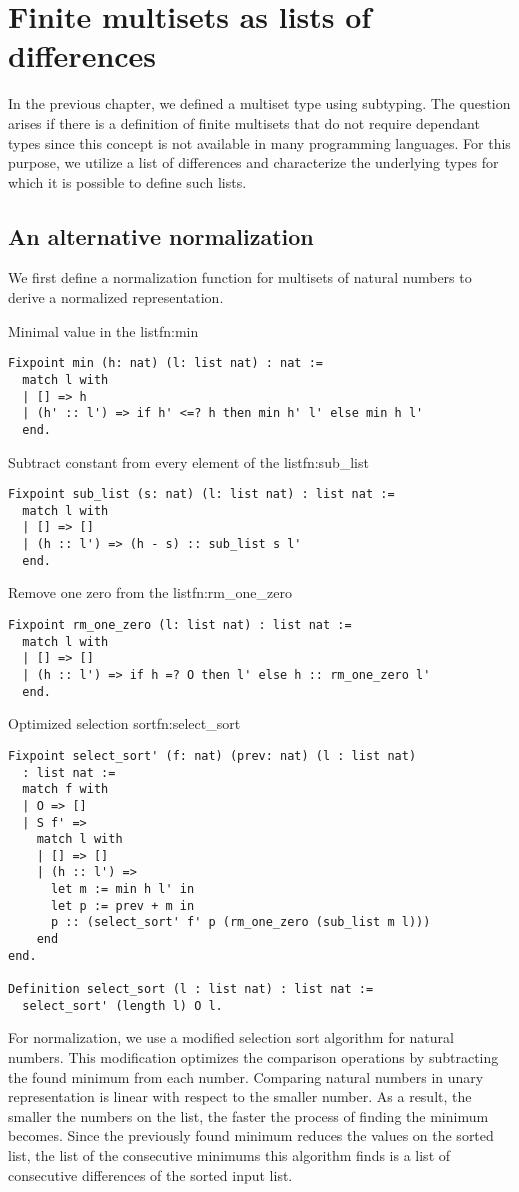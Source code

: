 \section{Finite multisets as lists of differences}
In the previous chapter, we defined a multiset type using subtyping. The question arises if there is a definition of finite multisets that do not require dependant types since this concept is not available in many programming languages. For this purpose, we utilize a list of differences and characterize the underlying types for which it is possible to define such lists.
\subsection{An alternative normalization}
We first define a normalization function for multisets of natural numbers to derive a normalized representation.
\begin{func}{Minimal value in the list}{fn:min}
\begin{verbatim}
Fixpoint min (h: nat) (l: list nat) : nat :=
  match l with
  | [] => h
  | (h' :: l') => if h' <=? h then min h' l' else min h l'
  end.
\end{verbatim}
\end{func}
\begin{func}{Subtract constant from every element of the list}{fn:sub_list}
\begin{verbatim}
Fixpoint sub_list (s: nat) (l: list nat) : list nat :=
  match l with
  | [] => []
  | (h :: l') => (h - s) :: sub_list s l'
  end.
\end{verbatim}
\end{func}
\begin{func}{Remove one zero from the list}{fn:rm_one_zero}
\begin{verbatim}
Fixpoint rm_one_zero (l: list nat) : list nat :=
  match l with
  | [] => []
  | (h :: l') => if h =? O then l' else h :: rm_one_zero l'
  end.
\end{verbatim}
\end{func}
\begin{func}[D]{Optimized selection sort}{fn:select_sort}
\begin{verbatim}
Fixpoint select_sort' (f: nat) (prev: nat) (l : list nat) 
  : list nat :=
  match f with
  | O => []
  | S f' =>
    match l with
    | [] => []
    | (h :: l') => 
      let m := min h l' in
      let p := prev + m in
      p :: (select_sort' f' p (rm_one_zero (sub_list m l)))
    end
end.

Definition select_sort (l : list nat) : list nat :=
  select_sort' (length l) O l.
\end{verbatim}
\end{func}
For normalization, we use a modified selection sort algorithm for natural numbers. This modification optimizes the comparison operations by subtracting the found minimum from each number. Comparing natural numbers in unary representation is linear with respect to the smaller number. As a result, the smaller the numbers on the list, the faster the process of finding the minimum becomes. Since the previously found minimum reduces the values on the sorted list, the list of the consecutive minimums this algorithm finds is a list of consecutive differences of the sorted input list.
